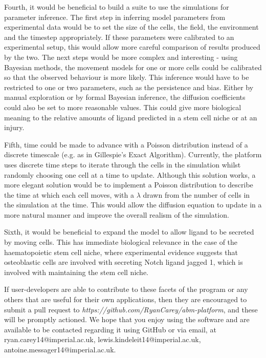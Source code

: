 \documentclass[12pt]{article}
\begin{document}
Fourth, it would be beneficial to build a suite to use the simulations 
for parameter inference. The first step in inferring model parameters 
from experimental data would be to set the size of the cells, the field, 
the environment and the timestep appropriately. If these parameters were 
calibrated to an experimental setup, this would allow more careful 
comparison of results produced by the two. The next steps would be more 
complex and interesting - using Bayesian methods, the movement models 
for one or more cells could be calibrated so that the observed behaviour 
is more likely. This inference would have to be restricted to one or two 
parameters, such as the persistence and bias. Either by manual 
exploration or by formal Bayesian inference, the diffusion coefficients 
could also be set to more reasonable values. This could give more 
biological meaning to the relative amounts of ligand predicted in a stem 
cell niche or at an injury.

Fifth, time could be made to advance with a Poisson distribution instead 
of a discrete timescale (e.g. as in Gillespie's Exact Algorithm). 
Currently, the platform uses discrete time steps to iterate through the 
cells in the simulation whilst randomly choosing one cell at a time to 
update. Although this solution works, a more elegant solution would be 
to implement a Poisson distribution to describe the time at which each 
cell moves, with a \(\lambda\) drawn from the number of cells in the simulation at 
the time. This would allow the diffusion equation to update in a more 
natural manner and improve the overall realism of the simulation.

Sixth, it would be beneficial to expand the model to allow ligand to be 
secreted by moving cells. This has immediate biological relevance in the 
case of the haematopoietic stem cell niche, where experimental evidence 
suggests that osteoblastic cells are involved with secreting Notch 
ligand jagged 1, which is involved with maintaining the stem cell niche.
\cite{roeder06}

If user-developers are able to contribute to these facets of the program 
or any others that are useful for their own applications, then they are 
encouraged to submit a pull request to {\itshape 
https://github.com/RyanCarey/abm-platform}, and these will be
promptly actioned. We hope that you enjoy using the software 
and are available to be contacted regarding it using GitHub or via 
email, at ryan.carey14@imperial.ac.uk, 
lewis.kindeleit14@imperial.ac.uk, 
antoine.messager14@imperial.ac.uk.
\end{document}
